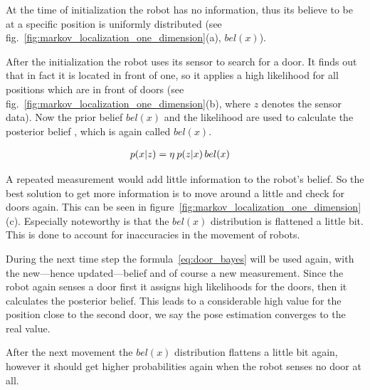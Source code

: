 \documentclass[Thesis.tex]{subfiles}
\begin{document}
At the time of initialization the robot has no information, thus its believe to be at a specific position is uniformly distributed (see fig.~\ref{fig:markov_localization_one_dimension}(a), $bel(x)$).

After the initialization the robot uses its sensor to search for a door. It finds out that in fact it is located in front of one, so it applies a high likelihood for all positions which are in front of doors (see fig.~\ref{fig:markov_localization_one_dimension}(b),  where $z$ denotes the sensor data). Now the prior belief $bel(x)$ and the likelihood  are used to calculate the posterior belief , which is again called $bel(x)$.

\begin{align}
p\!\left({x}\middle|{z}\right) &= \eta\: p\!\left({z}\middle|{x}\right) bel(x) \label{eq:door_bayes}
\end{align}

A repeated measurement would add little information to the robot's belief. So the best solution to get more information is to move around a little and check for doors again. This can be seen in figure~\ref{fig:markov_localization_one_dimension}(c). Especially noteworthy is that the $bel(x)$ distribution is flattened a little bit. This is done to account for inaccuracies in the movement of robots.

During the next time step the formula~\ref{eq:door_bayes} will be used again, with the new---hence updated---belief and of course a new measurement. Since the robot again senses a door first it assigns high likelihoods for the doors, then it calculates the posterior belief. This leads to a considerable high value for the position close to the second door, we say the pose estimation converges to the real value. 

After the next movement the $bel(x)$ distribution flattens a little bit again, however it should get higher probabilities again when the robot senses no door at all.
\end{document}
